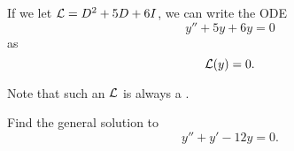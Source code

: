 \begin{applicationActivities}
\begin{observation}
If we let \(\mathcal{L}=D^2+5D+6I\), we can write the ODE \[y''+5y+6y=0\] as \[\mathcal{L}(y)=0.\]

Note that such an \(\mathcal{L}\) is always a .
\end{observation}

\begin{activity}{5}
Find the general solution to
\[y''+y'-12y=0.\]
\end{activity}



\end{applicationActivities}
